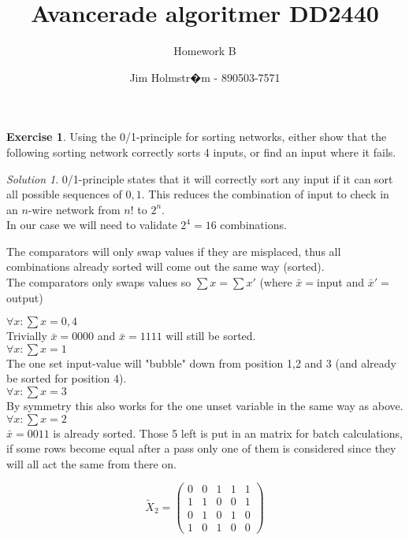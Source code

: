 \documentclass[a4paper,twoside=false,abstract=false,numbers=noenddot,
titlepage=false,headings=small,parskip=half,version=last]{scrartcl}
\author{Jim Holmstr�m - 890503-7571}
\title{Avancerade algoritmer DD2440}
\subtitle{Homework B}
\theoremstyle{definition}
\newtheorem{exercise}{Exercise}
\theoremstyle{remark}
\newtheorem*{solution}{Solution}
\begin{document}
\maketitle
\thispagestyle{empty}

\begin{exercise}
Using the 0/1-principle for sorting networks, either show that the following
sorting network correctly sorts 4 inputs, or find an input where it fails.
\end{exercise}
\begin{solution}
0/1-principle states that it will correctly sort any input if it can sort all
possible sequences of ${0,1}$. This reduces the combination of input to check
in an $n$-wire network from $n!$ to $2^n$.\\
In our case we will need to validate $2^4=16$ combinations.

The comparators will only swap values if they are misplaced, thus all
combinations already sorted will come out the same way (sorted).\\

The comparators only swaps values so $\sum{x}=\sum{x'}$ (where $\bar{x}=$input
and $\bar{x}'=$output)

$\forall x : \sum{x}=0,4$\\
Trivially $\bar{x}=0000$ and $\bar{x}=1111$ will still be sorted.\\
$\forall x : \sum{x}=1$\\
The one set input-value will "bubble" down from position 1,2 and 3 (and already be
sorted for position 4).\\ 
$\forall x : \sum{x}=3$\\
By symmetry this also works for the one unset variable in the same way as
above.
$\forall x : \sum{x}=2$\\
    $\bar{x}=0011$ is already sorted. Those 5 left is put in an matrix for
    batch calculations, if some rows become equal after a pass only one of them is
    considered since they will all act the same from there on.
    
    \begin{equation*}
        \tilde{X}_2= 
        \left(
        \begin{matrix}
            
                                     0 & 0 & 1 & 1 & 1 \\
                                     1 & 1 & 0 & 0 & 1 \\
                                     0 & 1 & 0 & 1 & 0 \\
                                     1 & 0 & 1 & 0 & 0
       \end{matrix}
       \right)
    \end{equation*}
    

\end{solution}
\end{document}
